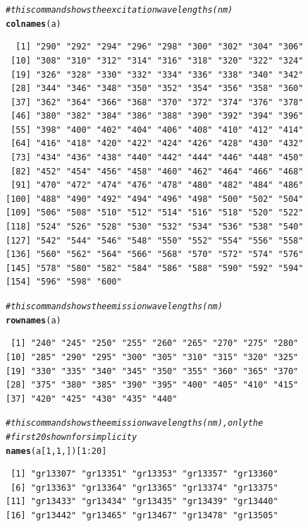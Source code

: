 \documentclass[a4paper,11pt]{article}\usepackage[]{graphicx}\usepackage[]{color}
\makeatletter
\newcommand{\hlnum}[1]{\textcolor[rgb]{0.686,0.059,0.569}{#1}}%
\newcommand{\hlcom}[1]{\textcolor[rgb]{0.678,0.584,0.686}{\textit{#1}}}%
\newcommand{\hlopt}[1]{\textcolor[rgb]{0,0,0}{#1}}%
\newcommand{\hlstd}[1]{\textcolor[rgb]{0.345,0.345,0.345}{#1}}%
\newcommand{\hlkwd}[1]{\textcolor[rgb]{0.737,0.353,0.396}{\textbf{#1}}}%
\newenvironment{kframe}{%
 \def\at@end@of@kframe{}%
 \ifinner\ifhmode%
  \def\at@end@of@kframe{\end{minipage}}%
  \begin{minipage}{\columnwidth}%
 \fi\fi%
 \def\FrameCommand##1{\hskip\@totalleftmargin \hskip-\fboxsep
 \colorbox{shadecolor}{##1}\hskip-\fboxsep
     \hskip-\linewidth \hskip-\@totalleftmargin \hskip\columnwidth}%
 \MakeFramed {\advance\hsize-\width
   \@totalleftmargin\z@ \linewidth\hsize
   \@setminipage}}%
 {\par\unskip\endMakeFramed%
 \at@end@of@kframe}
\newenvironment{knitrout}{}{} %
\makeatother
\begin{document}
\begin{knitrout}
\color{fgcolor}\begin{kframe}
\begin{alltt}
\hlcom{# this command shows the excitation wavelengths (nm)}
\hlkwd{colnames}\hlstd{(a)}
\end{alltt}
\begin{verbatim}
  [1] "290" "292" "294" "296" "298" "300" "302" "304" "306"
 [10] "308" "310" "312" "314" "316" "318" "320" "322" "324"
 [19] "326" "328" "330" "332" "334" "336" "338" "340" "342"
 [28] "344" "346" "348" "350" "352" "354" "356" "358" "360"
 [37] "362" "364" "366" "368" "370" "372" "374" "376" "378"
 [46] "380" "382" "384" "386" "388" "390" "392" "394" "396"
 [55] "398" "400" "402" "404" "406" "408" "410" "412" "414"
 [64] "416" "418" "420" "422" "424" "426" "428" "430" "432"
 [73] "434" "436" "438" "440" "442" "444" "446" "448" "450"
 [82] "452" "454" "456" "458" "460" "462" "464" "466" "468"
 [91] "470" "472" "474" "476" "478" "480" "482" "484" "486"
[100] "488" "490" "492" "494" "496" "498" "500" "502" "504"
[109] "506" "508" "510" "512" "514" "516" "518" "520" "522"
[118] "524" "526" "528" "530" "532" "534" "536" "538" "540"
[127] "542" "544" "546" "548" "550" "552" "554" "556" "558"
[136] "560" "562" "564" "566" "568" "570" "572" "574" "576"
[145] "578" "580" "582" "584" "586" "588" "590" "592" "594"
[154] "596" "598" "600"
\end{verbatim}
\begin{alltt}
\hlcom{# this command shows the emission wavelengths (nm)}
\hlkwd{rownames}\hlstd{(a)}
\end{alltt}
\begin{verbatim}
 [1] "240" "245" "250" "255" "260" "265" "270" "275" "280"
[10] "285" "290" "295" "300" "305" "310" "315" "320" "325"
[19] "330" "335" "340" "345" "350" "355" "360" "365" "370"
[28] "375" "380" "385" "390" "395" "400" "405" "410" "415"
[37] "420" "425" "430" "435" "440"
\end{verbatim}
\begin{alltt}
\hlcom{# this command shows the emission wavelengths (nm), only the}
\hlcom{# first 20 shown for simplicity}
\hlkwd{names}\hlstd{(a[}\hlnum{1}\hlstd{,} \hlnum{1}\hlstd{, ])[}\hlnum{1}\hlopt{:}\hlnum{20}\hlstd{]}
\end{alltt}
\begin{verbatim}
 [1] "gr13307" "gr13351" "gr13353" "gr13357" "gr13360"
 [6] "gr13363" "gr13364" "gr13365" "gr13374" "gr13375"
[11] "gr13433" "gr13434" "gr13435" "gr13439" "gr13440"
[16] "gr13442" "gr13465" "gr13467" "gr13478" "gr13505"
\end{verbatim}
\end{kframe}
\end{knitrout}
\end{document}
